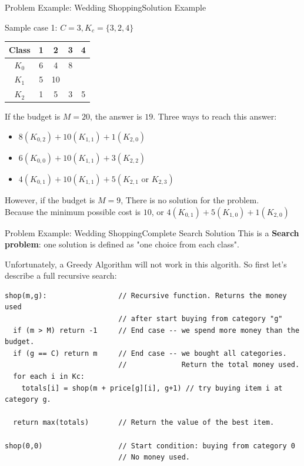 \begin{frame}{Problem Example: Wedding Shopping}{Solution Example}
  \begin{block}{Sample case 1: $C=3, K_c = \{3,2,4\}$}
  \begin{tabular}{|c|cccc|}
    Class & 1 & 2 & 3 & 4\\
    \hline
    $K_0$ & 6 & 4 & 8 & \\
    $K_1$ & 5 & 10 & & \\
    $K_2$ & 1 & 5 & 3 & 5\\
  \end{tabular}
  \end{block}
  \medskip

  If the budget is $M=20$, the answer is $19$. Three ways to reach this answer:
  \begin{itemize}
    \item $8(K_{0,2})+10(K_{1,1})+1(K_{2,0})$
    \item $6(K_{0,0})+10(K_{1,1})+3(K_{2,2})$
    \item $4(K_{0,1})+10(K_{1,1})+5(K_{2,1} \text{ or } K_{2,3})$
  \end{itemize}
  \bigskip

  However, if the budget is $M=9$, There is no solution for the problem.\\
  Because the minimum possible cost is $10$, or $4(K_{0,1})+5(K_{1,0})+1(K_{2,0})$
\end{frame}

\begin{frame}[fragile]{Problem Example: Wedding Shopping}{Complete Search Solution}
  This is a {\bf Search problem}: one solution is defined as "one choice from each class".\medskip

  Unfortunately, a Greedy Algorithm will not work in this algorith. So first let's describe a full recursive search:


{\smaller
\begin{verbatim}
shop(m,g):                 // Recursive function. Returns the money used
                           // after start buying from category "g"
  if (m > M) return -1     // End case -- we spend more money than the budget.
  if (g == C) return m     // End case -- we bought all categories.
                           //             Return the total money used.
  for each i in Kc:
    totals[i] = shop(m + price[g][i], g+1) // try buying item i at category g.

  return max(totals)       // Return the value of the best item.

shop(0,0)                  // Start condition: buying from category 0
                           // No money used.
\end{verbatim}
}
\end{frame}

